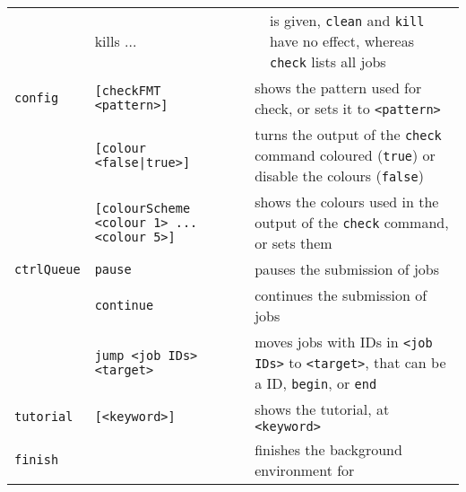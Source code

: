 \documentclass[a4paper,11pt]{article}
\begin{document}
\begin{landscape}
\begin{minipage}{1.0\textheight}
\begin{tabular}{lllll}
                                   & \cellcolor{RC1}kills ... &
                                   & \cellcolor{RC1}is given, \texttt{clean} and \texttt{kill} have no effect, whereas \texttt{check} lists all jobs\\
      \texttt{config}    & \texttt{[checkFMT <pattern>]}
                                   & \multicolumn{3}{l}{shows the pattern used for check, or sets it to \texttt{<pattern>}} \\
                         & \texttt{[colour <false|true>]}
                                   & \multicolumn{3}{l}{turns the output of the \texttt{check} command coloured (\texttt{true}) or disable the colours (\texttt{false})} \\
                         & \texttt{[colourScheme <colour 1> ... <colour 5>]}
                                   & \multicolumn{3}{l}{shows the colours used in the output of the \texttt{check} command, or sets them} \\
      \rowcolor{RC1}
      \texttt{ctrlQueue} & \texttt{pause}
                                   & \multicolumn{3}{l}{pauses the submission of jobs} \\
      \rowcolor{RC1}
                         & \texttt{continue}
                                   & \multicolumn{3}{l}{continues the submission of jobs} \\
      \rowcolor{RC1}
                         & \texttt{jump <job IDs> <target>}
                                   & \multicolumn{3}{l}{moves jobs with IDs in \texttt{<job IDs>} to \texttt{<target>}, that can be a ID, \texttt{begin}, or \texttt{end}} \\
      \texttt{tutorial}  & \texttt{[<keyword>]}
                                   & \multicolumn{3}{l}{shows the tutorial, at \texttt{<keyword>}} \\
      \rowcolor{RC1}
      \texttt{finish}    &
                                   & \multicolumn{3}{l}{finishes the background environment for \qpy{}} \\
      \hline
    \end{tabular}
  \end{minipage}\vspace{0.2cm}


\end{landscape}
\end{document}
